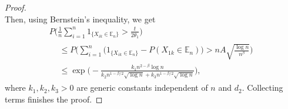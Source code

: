\begin{lemma}
\begin{proof}
\begin{equation*}
        \end{equation*}
        Then, using Bernstein's inequality, we get
        \begin{multline*}
            P\Big(\frac{1}{n} \sum_{i = 1}^n 1_{\{X_{ik} \in \mathbb{E}_n\}} > \frac{t}{2\theta_1}\Big) \\
            \begin{aligned}
                 & \leq P\Big(\sum_{i = 1}^n\big(1_{\{X_{ik} \in \mathbb{E}_n\}} - P(X_{1k} \in \mathbb{E}_n)\big) > nA\sqrt{\frac{\log n}{n^\beta}}\Big) \\
                 & \leq \exp\Big(- \frac{k_1 n^{2-\beta} \log n}{k_2 n^{1-\beta/2} \sqrt{\log n} + k_3 n^{1-\beta/2} \sqrt{\log n}} \Big),
            \end{aligned}
        \end{multline*}
        where $k_1,k_2,k_3 > 0$ are generic constants independent of $n$ and $d_2$. Collecting terms finishes the proof.
    \end{proof}
\end{lemma}

